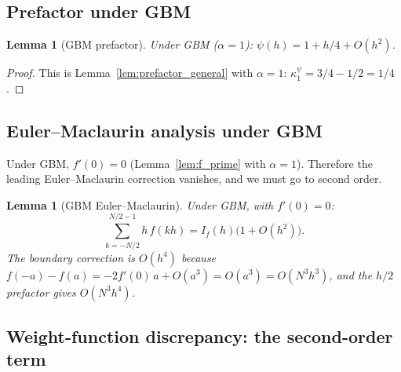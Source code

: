 \documentclass[11pt]{article}
\newtheorem{lemma}[theorem]{Lemma}
\theoremstyle{definition}
\theoremstyle{remark}
\begin{document}
\subsection{Prefactor under GBM}

\begin{lemma}[GBM prefactor]\label{lem:prefactor_gbm}
Under GBM ($\alpha = 1$):
$\psi(h) = 1 + h/4 + O(h^2)$.
\end{lemma}
\begin{proof}
This is Lemma~\ref{lem:prefactor_general} with $\alpha = 1$:
$\kappa_1^{\psi} = 3/4 - 1/2 = 1/4$.
\end{proof}

\subsection{Euler--Maclaurin analysis under GBM}

Under GBM, $f'(0) = 0$ (Lemma~\ref{lem:f_prime} with $\alpha = 1$).
Therefore the leading Euler--Maclaurin correction vanishes, and we
must go to second order.

\begin{lemma}[GBM Euler--Maclaurin]\label{lem:EM_gbm}
Under GBM, with $f'(0) = 0$:
\begin{equation}\label{eq:EM_gbm}
\sum_{k=-N/2}^{N/2-1} h\,f(kh)
= I_f(h)\bigl(1 + O(h^2)\bigr).
\end{equation}
The boundary correction is $O(h^4)$ because
$f(-a) - f(a) = -2f'(0)\,a + O(a^3) = O(a^3) = O(N^3 h^3)$,
and the $h/2$ prefactor gives $O(N^3 h^4)$.
\end{lemma}

\subsection{Weight-function discrepancy: the second-order term}
\end{document}

